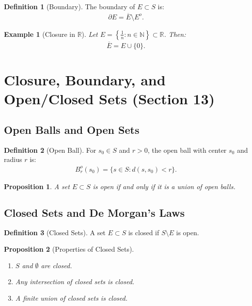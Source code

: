\documentclass[9pt]{article}
\theoremstyle{definition}
\newtheorem{definition}{Definition}
\theoremstyle{plain}
\newtheorem{proposition}{Proposition}
\newtheorem{example}{Example}
\begin{document}
\begin{definition}[Boundary]
The boundary of $ E \subset S $ is:
\begin{align}
\partial E = \overline{E} \setminus E^o.
\end{align}
\end{definition}

\begin{example}[Closure in $ \mathbb{R} $]
Let $ E = \left\{\frac{1}{n} : n \in \mathbb{N}\right\} \subset \mathbb{R} $. Then:
\begin{align}
\overline{E} = E \cup \{0\}.
\end{align}
\end{example}
\section*{Closure, Boundary, and Open/Closed Sets (Section 13)}

\subsection*{Open Balls and Open Sets}
\begin{definition}[Open Ball]
For $ s_0 \in S $ and $ r > 0 $, the open ball with center $ s_0 $ and radius $ r $ is:
\begin{align}
B_r^o(s_0) = \{s \in S : d(s, s_0) < r\}.
\end{align}
\end{definition}

\begin{proposition}
A set $ E \subset S $ is open if and only if it is a union of open balls.
\end{proposition}

\subsection*{Closed Sets and De Morgan's Laws}
\begin{definition}[Closed Sets]
A set $ E \subset S $ is closed if $ S \setminus E $ is open.
\end{definition}

\begin{proposition}[Properties of Closed Sets]

\begin{enumerate}
    \item $ S $ and $ \emptyset $ are closed.
    \item Any intersection of closed sets is closed.
    \item A finite union of closed sets is closed.
\end{enumerate}
\end{proposition}
\end{document}
